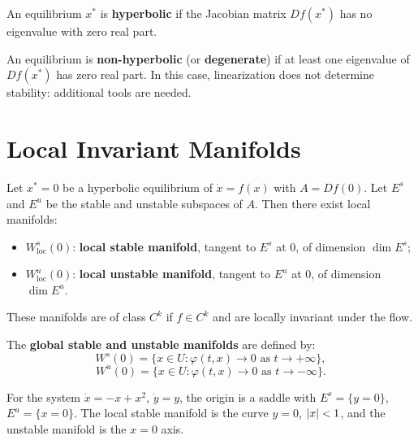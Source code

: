 \begin{definition}
An equilibrium $x^*$ is \textbf{hyperbolic} if the Jacobian matrix
$Df(x^*)$ has no eigenvalue with zero real part.
\end{definition}

\begin{definition}
An equilibrium is \textbf{non-hyperbolic} (or \textbf{degenerate}) if at
least one eigenvalue of $Df(x^*)$ has zero real part. In this case,
linearization does not determine stability: additional tools are needed.
\end{definition}

\section{Local Invariant Manifolds}

\begin{theorem}
\label{thm:stable-manifolds}
Let $x^* = 0$ be a hyperbolic equilibrium of $\dot{x} = f(x)$ with
$A = Df(0)$. Let $E^s$ and $E^u$ be the stable and unstable subspaces of
$A$. Then there exist local manifolds:
\begin{itemize}
    \item $W^s_{\mathrm{loc}}(0)$: \textbf{local stable manifold}, tangent
    to $E^s$ at $0$, of dimension $\dim E^s$;
    \item $W^u_{\mathrm{loc}}(0)$: \textbf{local unstable manifold}, tangent
    to $E^u$ at $0$, of dimension $\dim E^u$.
\end{itemize}
These manifolds are of class $C^k$ if $f \in C^k$ and are locally invariant
under the flow.
\end{theorem}

\begin{definition}
The \textbf{global stable and unstable manifolds} are defined by:
\[
    W^s(0) = \{x \in U : \varphi(t, x) \to 0 \text{ as } t \to +\infty\},
\]
\[
    W^u(0) = \{x \in U : \varphi(t, x) \to 0 \text{ as } t \to -\infty\}.
\]
\end{definition}

\begin{example}
For the system $\dot{x} = -x + x^2$, $\dot{y} = y$, the origin is a saddle
with $E^s = \{y = 0\}$, $E^u = \{x = 0\}$. The local stable manifold is the
curve $y = 0$, $\left| x \right| < 1$, and the unstable manifold is the $x = 0$ axis.
\end{example}

